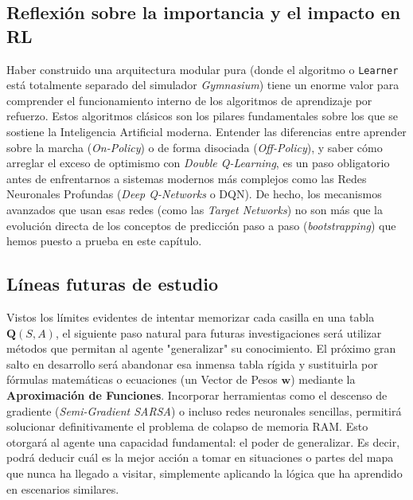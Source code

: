 \subsection{Reflexión sobre la importancia y el impacto en RL}
Haber construido una arquitectura modular pura (donde el algoritmo o \texttt{Learner} está totalmente separado del simulador \textit{Gymnasium}) tiene un enorme valor para comprender el funcionamiento interno de los algoritmos de aprendizaje por refuerzo. Estos algoritmos clásicos son los pilares fundamentales sobre los que se sostiene la Inteligencia Artificial moderna. Entender las diferencias entre aprender sobre la marcha (\textit{On-Policy}) o de forma disociada (\textit{Off-Policy}), y saber cómo arreglar el exceso de optimismo con \textit{Double Q-Learning}, es un paso obligatorio antes de enfrentarnos a sistemas modernos más complejos como las Redes Neuronales Profundas (\textit{Deep Q-Networks} o DQN). De hecho, los mecanismos avanzados que usan esas redes (como las \textit{Target Networks}) no son más que la evolución directa de los conceptos de predicción paso a paso (\textit{bootstrapping}) que hemos puesto a prueba en este capítulo.

\subsection{Líneas futuras de estudio}
Vistos los límites evidentes de intentar memorizar cada casilla en una tabla $\mathbf{Q}(S,A)$, el siguiente paso natural para futuras investigaciones será utilizar métodos que permitan al agente "generalizar" su conocimiento.
El próximo gran salto en desarrollo será abandonar esa inmensa tabla rígida y sustituirla por fórmulas matemáticas o ecuaciones (un Vector de Pesos $\mathbf{w}$) mediante la \textbf{Aproximación de Funciones}. Incorporar herramientas como el descenso de gradiente (\textit{Semi-Gradient SARSA}) o incluso redes neuronales sencillas, permitirá solucionar definitivamente el problema de colapso de memoria RAM. Esto otorgará al agente una capacidad fundamental: el poder de generalizar. Es decir, podrá deducir cuál es la mejor acción a tomar en situaciones o partes del mapa que nunca ha llegado a visitar, simplemente aplicando la lógica que ha aprendido en escenarios similares.
